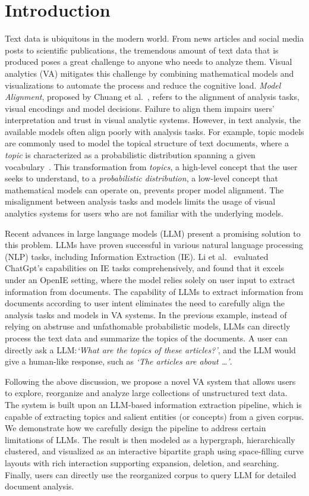 \section{Introduction}
Text data is ubiquitous in the modern world. 
From news articles and social media posts to scientific publications, the tremendous amount of text data that is produced poses a great challenge to anyone who needs to analyze them.
Visual analytics (VA) mitigates this challenge by combining mathematical models and visualizations to automate the process and reduce the cognitive load.
\textit{Model Alignment}, proposed by Chuang et al.~\cite{chuang2012interpretation}, refers to the alignment of analysis tasks, visual encodings and model decisions. 
Failure to align them impairs users' interpretation and trust in visual analytic systems.
However, in text analysis, the available models often align poorly with analysis tasks.
For example, topic models are commonly used to model the topical structure of text documents,
where a \textit{topic} is characterized as a probabilistic distribution spanning a given vocabulary~\cite{vayansky2020review}.
This transformation from \textit{topics}, a high-level concept that the user seeks to understand, to a \textit{probabilistic distribution}, a low-level concept that mathematical models can operate on, prevents proper model alignment.
The misalignment between analysis tasks and models limits the usage of visual analytics systems for users who are not familiar with the underlying models.

Recent advances in large language models (LLM) present a promising solution to this problem.
LLMs have proven successful in various natural language processing (NLP) tasks, including Information Extraction (IE).
Li et al.~\cite{li2023evaluateChatgpt} evaluated ChatGpt's capabilities on IE tasks comprehensively, and found that it excels under an OpenIE setting, where the model relies solely on user input to extract information from documents.
The capability of LLMs to extract information from documents according to user intent eliminates the need to carefully align the analysis tasks and models in VA systems.
In the previous example, instead of relying on abstruse and unfathomable probabilistic models, LLMs can directly process the text data and summarize the topics of the documents.
A user can directly ask a LLM:\@ \textit{`What are the topics of these articles?'}, and the LLM would give a human-like response, such as \textit{`The articles are about \ldots'}.

Following the above discussion, we propose a novel VA system that allows users to explore, reorganize and analyze large collections of unstructured text data.
The system is built upon an LLM-based information extraction pipeline, which is capable of extracting topics and salient entities (or concepts) from a given corpus.
We demonstrate how we carefully design the pipeline to address certain limitations of LLMs.
The result is then modeled as a hypergraph, hierarchically clustered, and visualized as an interactive bipartite graph using space-filling curve layouts with rich interaction supporting expansion, deletion, and searching.
Finally, users can directly use the reorganized corpus to query LLM for detailed document analysis.

